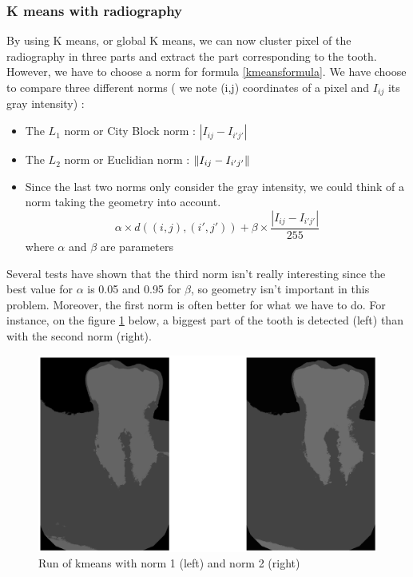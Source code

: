\subsubsection*{K means with radiography}
By using K means, or global K means, we can now cluster pixel of the radiography in three parts and extract the part corresponding to the tooth. However, we have to choose a norm for formula \ref{kmeansformula}. We have choose to compare three different norms ( we note (i,j) coordinates of a pixel and $I_{ij}$ its gray intensity) :
\begin{itemize}
\item The $L_{1}$ norm or City Block norm : $|I_{ij}-I_{i'j'}|$
\item The $L_{2}$ norm or Euclidian norm : $\left\lVert I_{ij}-I_{i'j'}\right\rVert$
\item Since the last two norms only consider the gray intensity, we could think of a norm taking the geometry into account.
\begin{equation}
\alpha \times d((i,j),(i',j')) + \beta \times \frac{|I_{ij}-I_{i'j'}|}{255}
\end{equation}
where $\alpha$ and $\beta$ are parameters
\end{itemize}
Several tests have shown that the third norm isn't really interesting since the best value for $\alpha$ is 0.05 and 0.95 for $\beta$, so geometry isn't important in this problem. Moreover, the first norm is often better for what we have to do. For instance, on the figure \ref{interestnorm} below, a biggest part of the tooth is detected (left) than with the second norm (right).
\begin{figure}[H]
\centering
\includegraphics[scale=0.3]{images/normkmeans.eps}
\caption{Run of kmeans with norm 1 (left) and norm 2 (right)}
\label{interestnorm}
\end{figure}

